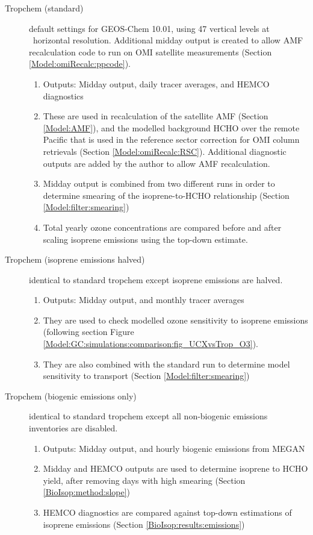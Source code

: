 \begin{description}
        \item [Tropchem (standard)]%
          default settings for GEOS-Chem 10.01, using 47 vertical levels at \lowhr ~horizontal resolution.
          Additional midday output is created to allow AMF recalculation code to run on OMI satellite measurements (Section \ref{Model:omiRecalc:ppcode}).
          \begin{enumerate}
            \item Outputs: Midday output, daily tracer averages, and HEMCO diagnostics
            \item These are used in recalculation of the satellite AMF (Section \ref{Model:AMF}), and the modelled background HCHO over the remote Pacific that is used in the reference sector correction for OMI column retrievals (Section \ref{Model:omiRecalc:RSC}).
            Additional diagnostic outputs are added by the author to allow AMF recalculation.
            \item Midday output is combined from two different runs in order to determine smearing of the isoprene-to-HCHO relationship (Section \ref{Model:filter:smearing})
            \item Total yearly ozone concentrations are compared before and after scaling isoprene emissions using the top-down estimate.
          \end{enumerate}
        
        \item [Tropchem (isoprene emissions halved)]%
          identical to standard tropchem except isoprene emissions are halved.
          \begin{enumerate}
            \item Outputs: Midday output, and monthly tracer averages 
            \item They are used to check modelled ozone sensitivity to isoprene emissions (following section Figure \ref{Model:GC:simulations:comparison:fig_UCXvsTrop_O3}).
            \item They are also combined with the standard run to determine model sensitivity to transport (Section \ref{Model:filter:smearing})
          \end{enumerate}
          
        \item [Tropchem (biogenic emissions only)]%
          identical to standard tropchem except all non-biogenic emissions inventories are disabled.
          \begin{enumerate}
            \item Outputs: Midday output, and hourly biogenic emissions from MEGAN
            \item Midday and HEMCO outputs are used to determine isoprene to HCHO yield, after removing days with high smearing (Section \ref{BioIsop:method:slope})
            \item HEMCO diagnostics are compared against top-down estimations of isoprene emissions (Section \ref{BioIsop:results:emissions})
          \end{enumerate}
        

\end{description}
